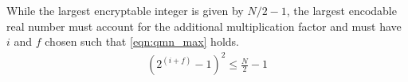 \documentclass[letterpaper, 10 pt, conference]{ieeeconf}  %
\begin{document}
While the largest encryptable integer is given by $N/2-1$, the largest encodable real number must account for the additional multiplication factor and must have $i$ and $f$ chosen such that \eqref{eqn:qmn_max} holds.
\begin{gather}
   (2^{(i+f)}-1)^2 \leq \frac{N}{2}-1 \label{eqn:qmn_max}
\end{gather}


\end{document}
